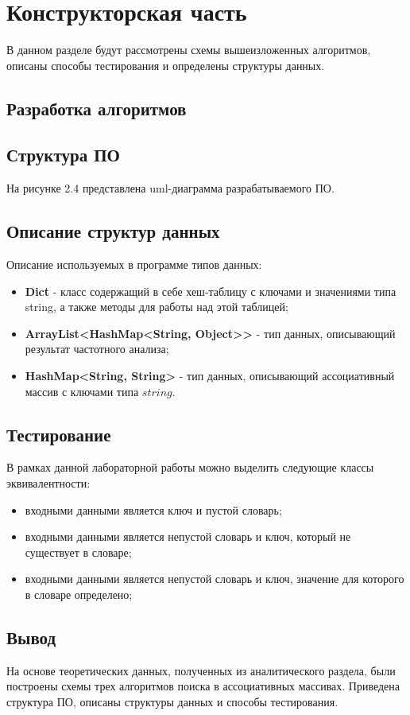 \chapter{Конструкторская часть}
В данном разделе будут рассмотрены схемы вышеизложенных алгоритмов, описаны способы тестирования и определены структуры данных. 
\section{Разработка алгоритмов}



\clearpage
{}



\clearpage
{}
\clearpage



\section{Структура ПО}
На рисунке 2.4 представлена uml-диаграмма разрабатываемого ПО.


\section{Описание структур данных}
Описание используемых в программе типов данных:

\begin{itemize}
    \item \textbf{Dict} - класс содержащий в себе хеш-таблицу с ключами и значениями типа string, а также методы для работы над этой таблицей;
    \item \textbf{ArrayList<HashMap<String, Object>>} - тип данных, описывающий результат частотного анализа; 
    \item \textbf{HashMap<String, String>} - тип данных, описывающий ассоциативный массив с ключами типа $string$.
\end{itemize}
  


\section{Тестирование}
В рамках данной лабораторной работы можно выделить следующие классы эквивалентности:
\begin{itemize}
    \item входными данными является ключ и пустой словарь;
    \item входными данными является непустой словарь и ключ, который не существует в словаре;
    \item входными данными является непустой словарь и ключ, значение для которого в словаре определено;
\end{itemize}

\section*{Вывод}

На основе теоретических данных, полученных из аналитического раздела, были построены схемы трех алгоритмов поиска в ассоциативных массивах. Приведена структура ПО, описаны структуры данных и способы тестирования.